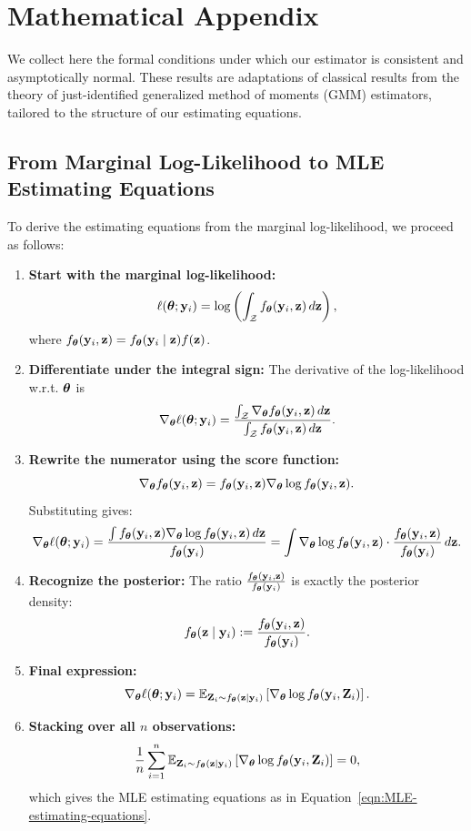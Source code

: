 \section{Mathematical Appendix}
\label{appendix:theory}

We collect here the formal conditions under which our estimator is consistent and asymptotically normal. These results are adaptations of classical results from the theory of just-identified generalized method of moments (GMM) estimators, tailored to the structure of our estimating equations.

\subsection{From Marginal Log-Likelihood to MLE Estimating Equations}
\label{apx:mle-estimating-equations}
To derive the estimating equations from the marginal log-likelihood, we proceed as follows:

\begin{enumerate}
    \item \textbf{Start with the marginal log-likelihood:}
    \[
    \ell({\bm{\theta}}; {\bf y}_i) = \log \left( \int_{\mathcal Z} f_{\bm{\theta}}({\bf y}_i, {\bf z})\,d{\bf z} \right),
    \]
    where \( f_{\bm{\theta}}({\bf y}_i, {\bf z}) = f_{\bm{\theta}}({\bf y}_i \mid {\bf z}) f({\bf z}) \).

    \item \textbf{Differentiate under the integral sign:}  
    The derivative of the log-likelihood w.r.t. \( {\bm{\theta}} \) is
    \[
    \nabla_{\bm{\theta}} \ell({\bm{\theta}}; {\bf y}_i) = \frac{ \int_{\mathcal Z} \nabla_{\bm{\theta}} f_{\bm{\theta}}({\bf y}_i, {\bf z})\, d{\bf z} }{ \int_{\mathcal Z} f_{\bm{\theta}}({\bf y}_i, {\bf z})\, d{\bf z} }.
    \]

    \item \textbf{Rewrite the numerator using the score function:}
    \[
    \nabla_{\bm{\theta}} f_{\bm{\theta}}({\bf y}_i, {\bf z}) = f_{\bm{\theta}}({\bf y}_i, {\bf z}) \nabla_{\bm{\theta}} \log f_{\bm{\theta}}({\bf y}_i, {\bf z}).
    \]
    Substituting gives:
    \[
    \nabla_{\bm{\theta}} \ell({\bm{\theta}}; {\bf y}_i)
    = \frac{ \int f_{\bm{\theta}}({\bf y}_i, {\bf z}) \nabla_{\bm{\theta}} \log f_{\bm{\theta}}({\bf y}_i, {\bf z})\, d{\bf z} }{ f_{\bm{\theta}}({\bf y}_i) }
    = \int \nabla_{\bm{\theta}} \log f_{\bm{\theta}}({\bf y}_i, {\bf z}) \cdot \frac{f_{\bm{\theta}}({\bf y}_i, {\bf z})}{f_{\bm{\theta}}({\bf y}_i)}\, d{\bf z}.
    \]

    \item \textbf{Recognize the posterior:}  
    The ratio \( \frac{f_{\bm{\theta}}({\bf y}_i, {\bf z})}{f_{\bm{\theta}}({\bf y}_i)} \) is exactly the posterior density:
    \[
    f_{\bm{\theta}}({\bf z} \mid {\bf y}_i) := \frac{f_{\bm{\theta}}({\bf y}_i, {\bf z})}{f_{\bm{\theta}}({\bf y}_i)}.
    \]

    \item \textbf{Final expression:}
    \[
    \nabla_{\bm{\theta}} \ell({\bm{\theta}}; {\bf y}_i)
    = \mathbb{E}_{{\bf Z}_i \sim f_{\bm{\theta}}({\bf z} \mid {\bf y}_i)} \left[ \nabla_{\bm{\theta}} \log f_{\bm{\theta}}({\bf y}_i, {\bf Z}_i) \right].
    \]

    \item \textbf{Stacking over all \( n \) observations:}
    \[
    \frac{1}{n} \sum_{i=1}^n \mathbb{E}_{{\bf Z}_i \sim f_{\bm{\theta}}({\bf z} \mid {\bf y}_i)} \left[ \nabla_{\bm{\theta}} \log f_{\bm{\theta}}({\bf y}_i, {\bf Z}_i) \right] = 0,
    \]
    which gives the MLE estimating equations as in Equation~\eqref{eqn:MLE-estimating-equations}.
\end{enumerate}





